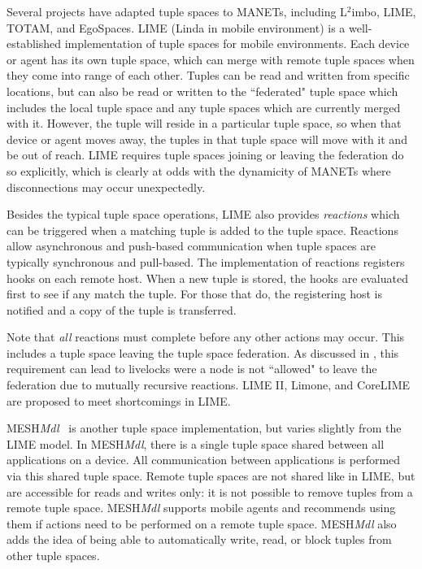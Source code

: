 Several projects have adapted tuple spaces to MANETs, including L$^{2}$imbo\cite{limbo}, LIME\cite{lime}, TOTAM\cite{totam}, and EgoSpaces\cite{egospaces}. LIME (Linda in mobile environment) is a well-established implementation of tuple spaces\cite{linda} for mobile environments. Each device or agent has its own tuple space, which can merge with remote tuple spaces when they come into range of each other. Tuples can be read and written from specific locations, but can also be read or written to the ``federated" tuple space which includes the local tuple space and any tuple spaces which are currently merged with it. However, the tuple will reside in a particular tuple space, so when that device or agent moves away, the tuples in that tuple space will move with it and be out of reach. LIME requires tuple spaces joining or leaving the federation do so explicitly, which is clearly at odds with the dynamicity of MANETs where disconnections may occur unexpectedly.

Besides the typical tuple space operations, LIME also provides \textit{reactions} which can be triggered when a matching tuple is added to the tuple space. Reactions allow asynchronous and push-based communication when tuple spaces are typically synchronous and pull-based. The implementation of reactions registers hooks on each remote host. When a new tuple is stored, the hooks are evaluated first to see if any match the tuple. For those that do, the registering host is notified and a copy of the tuple is transferred.

Note that \textit{all} reactions must complete before any other actions may occur. This includes a tuple space leaving the tuple space federation. As discussed in \cite{limerevisted}, this requirement can lead to livelocks were a node is not ``allowed" to leave the federation due to mutually recursive reactions. LIME II\cite{lime2}, Limone\cite{limone}, and CoreLIME\cite{corelime} are proposed to meet shortcomings in LIME.

MESH\textit{Mdl}~\cite{meshmdl}  is another tuple space implementation, but varies slightly from the LIME model. In MESH\textit{Mdl}, there is a single tuple space shared between all applications on a device. All communication between applications is performed via  this shared tuple space. Remote tuple spaces are not shared like in LIME, but are accessible for reads and writes only: it is not possible to remove tuples from a remote tuple space. MESH\textit{Mdl} supports mobile agents and recommends using them if actions need to be performed on a remote tuple space. MESH\textit{Mdl} also adds the idea of being able to automatically write, read, or block tuples from other tuple spaces.


